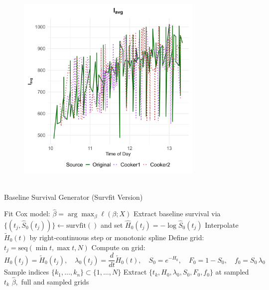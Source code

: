 \documentclass[
]{article}
\begin{document}
\begin{figure}[H]
  \centering
  \includegraphics[width=0.8\textwidth, height= 10cm]{plots/ggplot_orig_vs_sim.png}
  \label{fig:Environmental_data_generation}
\end{figure}

\begin{algorithm}[H]
\caption{Baseline Survival Generator (Survfit Version)}
\label{alg:baseline-surv-survfit}
\SetAlgoLined
{}
\BlankLine
\; Fit Cox model: \(\hat\beta = \arg\max_\beta \ell(\beta;X)\)\;
\; Extract baseline survival via \(\{(t_j,\hat S_0(t_j))\}\leftarrow\mathrm{survfit}()\) and set 
  \(\hat H_0(t_j)=-\log\hat S_0(t_j)\)\;
\; Interpolate \(\tilde H_0(t)\) by right‐continuous step or monotonic spline\;
\; Define grid: \(t_j = \mathrm{seq}(\min t,\max t,N)\)\;
\; Compute on grid:
  \[
    H_0(t_j)=\tilde H_0(t_j),\quad
    \lambda_0(t_j)=\frac{d}{dt}\tilde H_0(t),\quad
    S_0=e^{-H_0},\quad
    F_0=1-S_0,\quad
    f_0=S_0\,\lambda_0
  \]\;
\; Sample indices \(\{k_1,\dots,k_n\}\subset\{1,\dots,N\}\)\;
\; Extract \(\{t_k,H_0,\lambda_0,S_0,F_0,f_0\}\) at sampled \(t_k\)\;
\; \Return \(\hat\beta,\) full and sampled grids
\end{algorithm}
\end{document}
